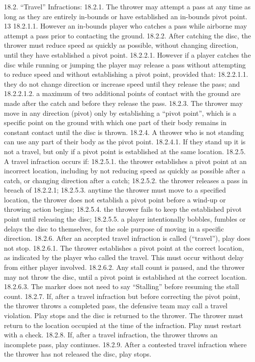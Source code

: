 18.2. “Travel” Infractions:
18.2.1. The thrower may attempt a pass at any time as long as they are entirely in-bounds or have
established an in-bounds pivot point.
13
18.2.1.1. However an in-bounds player who catches a pass while airborne may attempt a pass prior
to contacting the ground.
18.2.2. After catching the disc, the thrower must reduce speed as quickly as possible, without changing
direction, until they have established a pivot point.
18.2.2.1. However if a player catches the disc while running or jumping the player may release a
pass without attempting to reduce speed and without establishing a pivot point, provided
that:
18.2.2.1.1. they do not change direction or increase speed until they release the pass; and
18.2.2.1.2. a maximum of two additional points of contact with the ground are made after the
catch and before they release the pass.
18.2.3. The thrower may move in any direction (pivot) only by establishing a “pivot point”, which is a
specific point on the ground with which one part of their body remains in constant contact until
the disc is thrown.
18.2.4. A thrower who is not standing can use any part of their body as the pivot point.
18.2.4.1. If they stand up it is not a travel, but only if a pivot point is established at the same
location.
18.2.5. A travel infraction occurs if:
18.2.5.1. the thrower establishes a pivot point at an incorrect location, including by not reducing
speed as quickly as possible after a catch, or changing direction after a catch;
18.2.5.2. the thrower releases a pass in breach of 18.2.2.1;
18.2.5.3. anytime the thrower must move to a specified location, the thrower does not establish a
pivot point before a wind-up or throwing action begins;
18.2.5.4. the thrower fails to keep the established pivot point until releasing the disc;
18.2.5.5. a player intentionally bobbles, fumbles or delays the disc to themselves, for the sole
purpose of moving in a specific direction.
18.2.6. After an accepted travel infraction is called (“travel”), play does not stop.
18.2.6.1. The thrower establishes a pivot point at the correct location, as indicated by the player
who called the travel. This must occur without delay from either player involved.
18.2.6.2. Any stall count is paused, and the thrower may not throw the disc, until a pivot point is
established at the correct location.
18.2.6.3. The marker does not need to say “Stalling” before resuming the stall count.
18.2.7. If, after a travel infraction but before correcting the pivot point, the thrower throws a
completed pass, the defensive team may call a travel violation. Play stops and the disc is
returned to the thrower. The thrower must return to the location occupied at the time of the
infraction. Play must restart with a check.
18.2.8. If, after a travel infraction, the thrower throws an incomplete pass, play continues.
18.2.9. After a contested travel infraction where the thrower has not released the disc, play stops.
